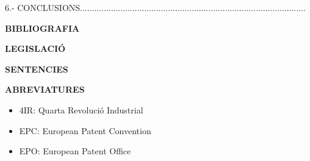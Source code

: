 \documentclass[12pt]{article}
\begin{document}
\vspace{\baselineskip}
\begin{justify}
6.- CONCLUSIONS...............................................................................................
\end{justify}\par


\vspace{\baselineskip}

\vspace{\baselineskip}
\begin{justify}
\textbf{BIBLIOGRAFIA}
\end{justify}\par


\vspace{\baselineskip}

\vspace{\baselineskip}
\begin{justify}
\textbf{LEGISLACIÓ }
\end{justify}\par


\vspace{\baselineskip}

\vspace{\baselineskip}
\begin{justify}
\textbf{SENTENCIES}
\end{justify}\par


\vspace{\baselineskip}

\vspace{\baselineskip}
\begin{Center}
{\fontsize{16pt}{19.2pt}\selectfont \textbf{ABREVIATURES}\par}
\end{Center}\par


\vspace{\baselineskip}

\vspace{\baselineskip}

\vspace{\baselineskip}
\begin{itemize}
	\item 4IR: Quarta Revolució Industrial\par


\vspace{\baselineskip}
	\item EPC: European Patent Convention\par


\vspace{\baselineskip}
	\item EPO: European Patent Office
\end{itemize}\par
\end{document}
